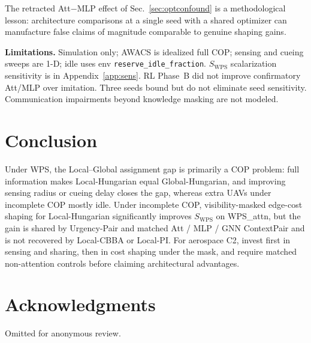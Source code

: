 \documentclass[journal,twocolumn,10pt]{IEEEtran}
\begin{document}
The retracted Att$-$MLP effect of Sec.~\ref{sec:optconfound} is a methodological lesson: architecture comparisons at a single seed with a shared optimizer can manufacture false claims of magnitude comparable to genuine shaping gains.

\textbf{Limitations.}
Simulation only; AWACS is idealized full COP; sensing and cueing sweeps are 1-D; idle uses env \texttt{reserve\_idle\_fraction}.
\(S_{\mathrm{WPS}}\) scalarization sensitivity is in Appendix~\ref{app:sens}.
RL Phase~B did not improve confirmatory Att/MLP over imitation.
Three seeds bound but do not eliminate seed sensitivity.
Communication impairments beyond knowledge masking are not modeled.

\section{Conclusion}
Under WPS, the Local--Global assignment gap is primarily a COP problem: full information makes Local-Hungarian equal Global-Hungarian, and improving sensing radius or cueing delay closes the gap, whereas extra UAVs under incomplete COP mostly idle.
Under incomplete COP, visibility-masked edge-cost shaping for Local-Hungarian significantly improves \(S_{\mathrm{WPS}}\) on WPS\_attn, but the gain is shared by Urgency-Pair and matched Att / MLP / GNN ContextPair and is not recovered by Local-CBBA or Local-PI.
For aerospace C2, invest first in sensing and sharing, then in cost shaping under the mask, and require matched non-attention controls before claiming architectural advantages.

\section*{Acknowledgments}
Omitted for anonymous review.

\appendix
\end{document}
